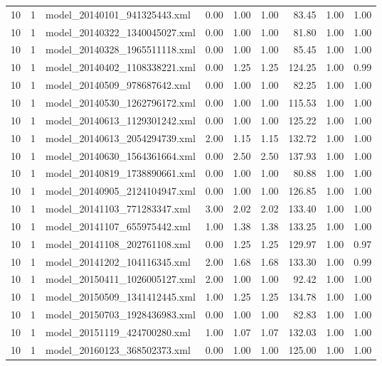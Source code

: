 \begin{table}[ht]
\begin{tabular}{rrlrrrrrr}
   10 &   1 & model\_20140101\_941325443.xml & 0.00 & 1.00 & 1.00 & 83.45 & 1.00 & 1.00 \\ 
   10 &   1 & model\_20140322\_1340045027.xml & 0.00 & 1.00 & 1.00 & 81.80 & 1.00 & 1.00 \\ 
   10 &   1 & model\_20140328\_1965511118.xml & 0.00 & 1.00 & 1.00 & 85.45 & 1.00 & 1.00 \\ 
   10 &   1 & model\_20140402\_1108338221.xml & 0.00 & 1.25 & 1.25 & 124.25 & 1.00 & 0.99 \\ 
   10 &   1 & model\_20140509\_978687642.xml & 0.00 & 1.00 & 1.00 & 82.25 & 1.00 & 1.00 \\ 
   10 &   1 & model\_20140530\_1262796172.xml & 0.00 & 1.00 & 1.00 & 115.53 & 1.00 & 1.00 \\ 
   10 &   1 & model\_20140613\_1129301242.xml & 0.00 & 1.00 & 1.00 & 125.22 & 1.00 & 1.00 \\ 
   10 &   1 & model\_20140613\_2054294739.xml & 2.00 & 1.15 & 1.15 & 132.72 & 1.00 & 1.00 \\ 
   10 &   1 & model\_20140630\_1564361664.xml & 0.00 & 2.50 & 2.50 & 137.93 & 1.00 & 1.00 \\ 
   10 &   1 & model\_20140819\_1738890661.xml & 0.00 & 1.00 & 1.00 & 80.88 & 1.00 & 1.00 \\ 
   10 &   1 & model\_20140905\_2124104947.xml & 0.00 & 1.00 & 1.00 & 126.85 & 1.00 & 1.00 \\ 
   10 &   1 & model\_20141103\_771283347.xml & 3.00 & 2.02 & 2.02 & 133.40 & 1.00 & 1.00 \\ 
   10 &   1 & model\_20141107\_655975442.xml & 1.00 & 1.38 & 1.38 & 133.25 & 1.00 & 1.00 \\ 
   10 &   1 & model\_20141108\_202761108.xml & 0.00 & 1.25 & 1.25 & 129.97 & 1.00 & 0.97 \\ 
   10 &   1 & model\_20141202\_104116345.xml & 2.00 & 1.68 & 1.68 & 133.30 & 1.00 & 0.99 \\ 
   10 &   1 & model\_20150411\_1026005127.xml & 2.00 & 1.00 & 1.00 & 92.42 & 1.00 & 1.00 \\ 
   10 &   1 & model\_20150509\_1341412445.xml & 1.00 & 1.25 & 1.25 & 134.78 & 1.00 & 1.00 \\ 
   10 &   1 & model\_20150703\_1928436983.xml & 0.00 & 1.00 & 1.00 & 82.83 & 1.00 & 1.00 \\ 
   10 &   1 & model\_20151119\_424700280.xml & 1.00 & 1.07 & 1.07 & 132.03 & 1.00 & 1.00 \\ 
   10 &   1 & model\_20160123\_368502373.xml & 0.00 & 1.00 & 1.00 & 125.00 & 1.00 & 1.00 \\ 

\end{tabular}
\end{table}
